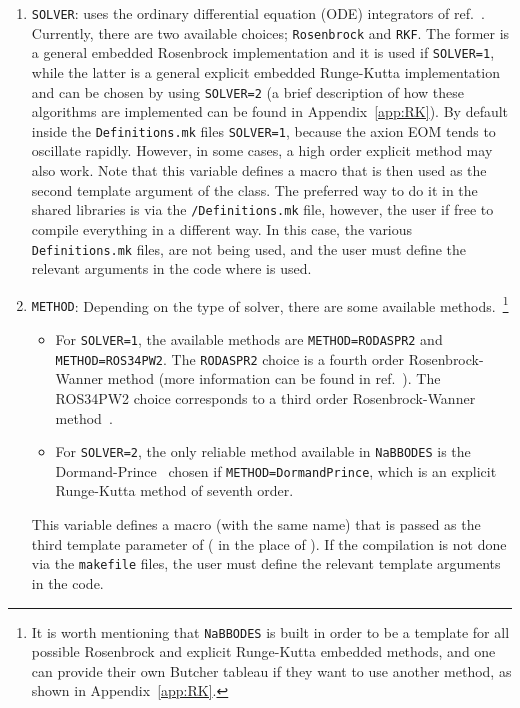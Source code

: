 \documentclass[11pt,a4paper]{article}
\begin{document}
\begin{enumerate}
	\item {\tt SOLVER}: \mimes uses the ordinary differential equation (ODE) integrators of ref.~\cite{NaBBODES}. Currently, there are two available choices; {\tt Rosenbrock} and {\tt RKF}. The former is a general embedded Rosenbrock implementation and it is used if {\tt SOLVER=1}, while the latter is a general explicit embedded Runge-Kutta implementation and can be chosen by using {\tt SOLVER=2} (a brief description of how these algorithms are implemented can be found in Appendix~\ref{app:RK}). By default inside the {\tt Definitions.mk} files {\tt SOLVER=1}, because the axion EOM tends to oscillate rapidly. However, in some cases, a high order explicit method may also work. Note that this variable defines a macro that is then used as the second template argument of the  class. The preferred way to do it in the shared libraries is via the {\tt \mimes/Definitions.mk} file, however, the user if free to compile everything in a different way. In this case, the  various {\tt Definitions.mk} files, are not being used, and the user must define the relevant arguments in the code where \mimes is used.
	\item {\tt METHOD}: Depending on the type of solver, there are some available methods.~\footnote{It is worth mentioning that {\tt NaBBODES} is built in order to be a template for all possible Rosenbrock and explicit Runge-Kutta embedded methods, and one can provide their own Butcher tableau if they want to use another method, as shown in Appendix~\ref{app:RK}.}  
	\begin{itemize}
		\item 	For {\tt SOLVER=1}, the available methods are 
		{\tt METHOD=RODASPR2} and {\tt METHOD=ROS34PW2}. The {\tt RODASPR2} choice is a fourth order Rosenbrock-Wanner method (more information can be found in ref.~\cite{RANG2015128}). The {ROS34PW2} choice corresponds to a third order Rosenbrock-Wanner method~\cite{RangAngermann2005}. 
		\item 	For {\tt SOLVER=2}, the only reliable method available in {\tt NaBBODES} is the Dormand-Prince~\cite{DORMAND198019} chosen if {\tt METHOD=DormandPrince}, which is an explicit Runge-Kutta method of seventh order.
	\end{itemize}
	This variable defines a macro (with the same name) that is passed as the third template parameter of  (\ie {} in the place of ). 
	If the compilation is not done via the {\tt makefile} files, the user must define the relevant template arguments in the code.

\end{enumerate}
\end{document}
